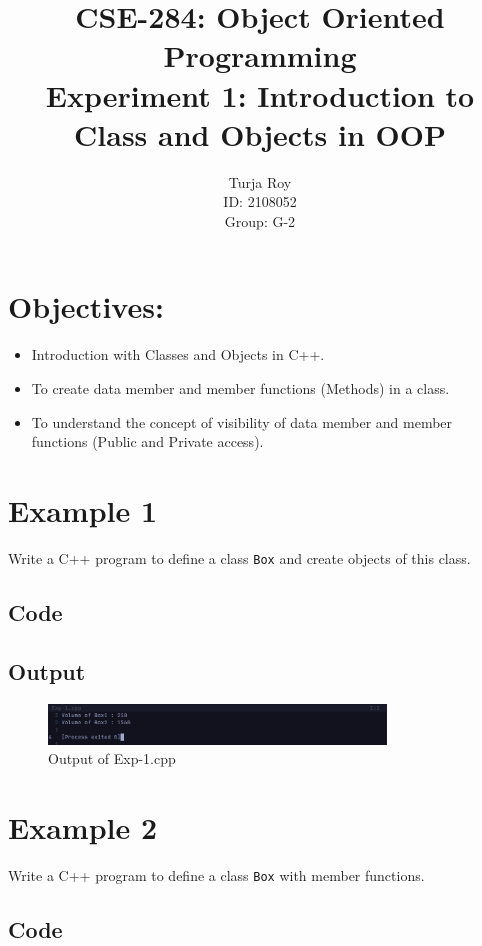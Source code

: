 \documentclass[12pt]{article}
\title{
    CSE-284: Object Oriented Programming \\
    Experiment 1: Introduction to Class and Objects in OOP
}
\author{
    Turja Roy \\ 
    ID: 2108052 \\ 
    Group: G-2
}
\date{}
\begin{document}
\maketitle

\section*{Objectives:}
\begin{itemize}
    \item Introduction with Classes and Objects in C++. 
    \item To create data member and member functions (Methods) in a class. 
    \item To understand the concept of visibility of data member and member functions (Public and Private access).
\end{itemize}


\FloatBarrier
\section*{Example 1}
Write a C++ program to define a class \texttt{Box} and create objects of this class.

\subsection*{Code}


\subsection*{Output}
\begin{figure}[htpb]
    \centering
    \includegraphics[width=0.8\textwidth]{Exp-1.png}
    \caption{Output of Exp-1.cpp}
\end{figure}


\FloatBarrier
\section*{Example 2}
Write a C++ program to define a class \texttt{Box} with member functions.

\subsection*{Code}

\end{document}
